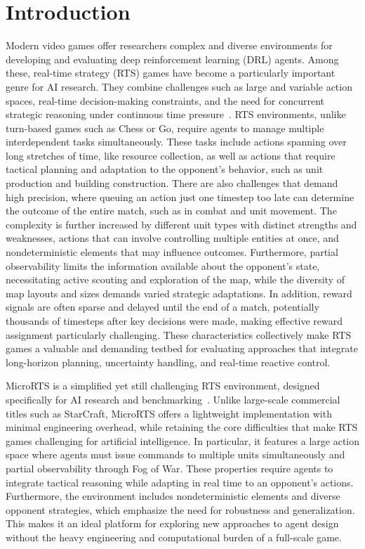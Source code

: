 \documentclass[10pt,twocolumn,letterpaper]{article}
\begin{document}
\tableofcontents
\newpage

\section{Introduction}
\label{sec:intro}

Modern video games offer researchers complex and diverse environments for developing and evaluating deep reinforcement learning (DRL) agents. Among these, real-time strategy (RTS) games have become a particularly important genre for AI research. They combine challenges such as large and variable action spaces, real-time decision-making constraints, and the need for concurrent strategic reasoning under continuous time pressure~\cite{ontanon2013survey}. RTS environments, unlike turn-based games such as Chess or Go, require agents to manage multiple interdependent tasks simultaneously. These tasks include actions spanning over long stretches of time, like resource collection, as well as actions that require tactical planning and adaptation to the opponent’s behavior, such as unit production and building construction. There are also challenges that demand high precision, where queuing an action just one timestep too late can determine the outcome of the entire match, such as in combat and unit movement. The complexity is further increased by different unit types with distinct strengths and weaknesses, actions that can involve controlling multiple entities at once, and nondeterministic elements that may influence outcomes. Furthermore, partial observability limits the information available about the opponent’s state, necessitating active scouting and exploration of the map, while the diversity of map layouts and sizes demands varied strategic adaptations. In addition, reward signals are often sparse and delayed until the end of a match, potentially thousands of timesteps after key decisions were made, making effective reward assignment particularly challenging. These characteristics collectively make RTS games a valuable and demanding testbed for evaluating approaches that integrate long-horizon planning, uncertainty handling, and real-time reactive control.

MicroRTS is a simplified yet still challenging RTS environment, designed specifically for AI research and benchmarking~\cite{huang2021gym}. Unlike large-scale commercial titles such as StarCraft, MicroRTS offers a lightweight implementation with minimal engineering overhead, while retaining the core difficulties that make RTS games challenging for artificial intelligence. In particular, it features a large action space where agents must issue commands to multiple units simultaneously and partial observability through Fog of War. These properties require agents to integrate tactical reasoning while adapting in real time to an opponent’s actions. Furthermore, the environment includes nondeterministic elements and diverse opponent strategies, which emphasize the need for robustness and generalization. This makes it an ideal platform for exploring new approaches to agent design without the heavy engineering and computational burden of a full-scale game.
\end{document}

